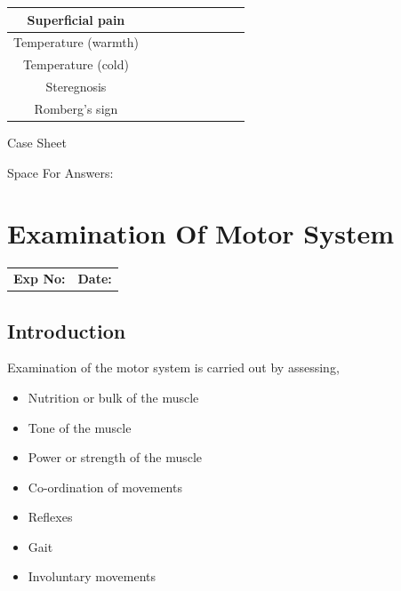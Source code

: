 \documentclass[a4paper,12pt,openany,twoside]{book}
\newcommand{\blankpageForCaseSheet}{
	\newpage
	\thispagestyle{plain}
	\begin{center}
		\huge Case Sheet 
	\end{center}
	\newpage
	\thispagestyle{plain}
	\mbox{}
	}
\newcommand{\blankpageForAnswers}{
	\newpage
	\thispagestyle{plain}
	\begin{center}
		\Large Space For Answers: 
	\end{center}
	}
\begin{document}
\begin{table}[H]
{\begin{tabular}{|c|c|c|c|c|c|c|c|c|}
Superficial pain                    &                    &                   &                    &                   &                   &                  &                   &                  \\ \hline
Temperature (warmth)                &                    &                   &                    &                   &                   &                  &                   &                  \\ \hline
Temperature (cold)                  &                    &                   &                    &                   &                   &                  &                   &                  \\ \hline
Steregnosis                         &                    &                   &                    &                   &                   &                  &                   &                  \\ \hline
Romberg's sign                      & \multicolumn{8}{c|}{}                                                                                                                                         \\ \hline
\end{tabular}%
}
\end{table}
\renewcommand{\arraystretch}{1}
\fi
\blankpageForCaseSheet
\blankpageForAnswers
															\chapter*{\centering Examination Of Motor System}
															\begin{tabular}{p{5in} p{1in}}
																\textbf{Exp No:}  & \textbf{Date:}\\
															\end{tabular}
															\section*{Introduction}
Examination of the motor system is carried out by assessing,
\begin{itemize}
		\itemsep0em
\item{Nutrition or bulk of the muscle}
\item{Tone of the muscle}
\item{Power or strength of the muscle}
\item{Co-ordination of movements}
\item{Reflexes}
\item{Gait}
\item{Involuntary movements}
\end{itemize}
\end{document}

